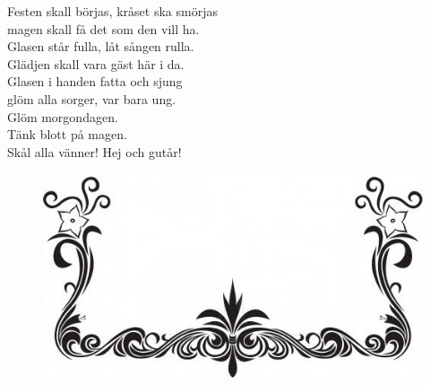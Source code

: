 \documentclass[a6paper,10pt]{article}
\begin{document}
\noindent
{}
\begin{center}
\end{center}
\begin{lyrics}
\small Festen skall börjas, kråset ska smörjas\\
magen skall få det som den vill ha.\\
Glasen står fulla, låt sången rulla.\\
Glädjen skall vara gäst här i da.
\vspace{5pt}\\
Glasen i handen fatta och sjung\\
glöm alla sorger, var bara ung.\\
Glöm morgondagen.\\
Tänk blott på magen.\\
Skål alla vänner! Hej och gutår!
\end{lyrics}
\vfill
\begin{figure}[!h]
\centering
\includegraphics[width=1.0\textwidth]{fin.jpg}
\end{figure}
\end{document}
